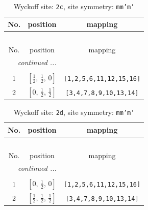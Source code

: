 \documentclass[fleqn,8pt]{jsarticle}
\begin{document}
\renewcommand{\arraystretch}{1.2}
\begin{longtable}{ccc}
\caption{Wyckoff site: {\tt 2c}, site symmetry: {\tt mm'm'}}
 \\
 \hline \hline
No. & position & mapping \\ \hline \endfirsthead

\multicolumn{2}{l}{\tablename\ \thetable{}} \\
 \hline \hline
No. & position & mapping \\ \hline \endhead

 \hline \hline
\multicolumn{2}{r}{\footnotesize\it continued ...} \\ \endfoot

 \hline \hline
\multicolumn{2}{r}{} \\ \endlastfoot

1 & $\left[ \frac{1}{2},\, \frac{1}{2},\, 0 \right]$ & {\tt [1,2,5,6,11,12,15,16]} \\ \hline
2 & $\left[ 0,\, \frac{1}{2},\, \frac{1}{2} \right]$ & {\tt [3,4,7,8,9,10,13,14]} \\
\end{longtable}
\renewcommand{\arraystretch}{1.2}
\begin{longtable}{ccc}
\caption{Wyckoff site: {\tt 2d}, site symmetry: {\tt mm'm'}}
 \\
 \hline \hline
No. & position & mapping \\ \hline \endfirsthead

\multicolumn{2}{l}{\tablename\ \thetable{}} \\
 \hline \hline
No. & position & mapping \\ \hline \endhead

 \hline \hline
\multicolumn{2}{r}{\footnotesize\it continued ...} \\ \endfoot

 \hline \hline
\multicolumn{2}{r}{} \\ \endlastfoot

1 & $\left[ 0,\, \frac{1}{2},\, 0 \right]$ & {\tt [1,2,5,6,11,12,15,16]} \\ \hline
2 & $\left[ \frac{1}{2},\, \frac{1}{2},\, \frac{1}{2} \right]$ & {\tt [3,4,7,8,9,10,13,14]} \\
\end{longtable}
\renewcommand{\arraystretch}{1.2}
\end{document}

